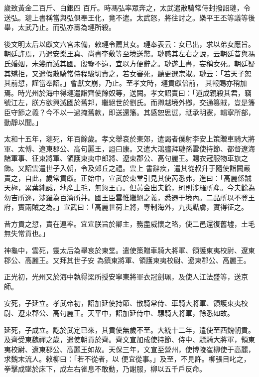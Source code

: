 \begin{pinyinscope}
 歲致黃金二百斤、白銀四
 百斤。時馮弘率眾奔之，太武遣散騎常侍封撥詔璉，令送弘。璉上書稱當與弘俱奉王化，竟不遣。太武怒，將往討之。樂平王丕等議等後舉，太武乃止。而弘亦壽為璉所殺。



 後文明太后以獻文六宮未備，敕璉令薦其女。璉奉表云：女已出，求以弟女應旨。朝廷許焉，乃遣安樂王真、尚書李敷等至境送幣。璉惑其左右之說，云朝廷昔與馮氏婚姻，未幾而滅其國。殷鑒不遠，宜以方便辭之。璉遂上書，妄稱女死。朝廷疑其矯拒，又遣假散騎常侍程駿切責之，若女審死，聽更選宗淑。璉云：「若天子恕其前愆，謹當奉詔。」會獻文崩，乃止。至孝文時，璉貢獻倍前，
 其報賜亦稍加焉。時光州於海中得璉遣詣齊使餘奴等，送闕。孝文詔責曰：「道成親殺其君，竊號江左，朕方欲興滅國於舊邦，繼絕世於劉氏。而卿越境外鄉，交通篡賊，豈是籓臣守節之義？今不以一過掩舊款，即送還籓。其感恕思愆，祗承明憲，輯寧所部，動靜以聞。」



 太和十五年，璉死，年百餘歲。孝文舉哀於東郊，遣謁者僕射李安上策贈車騎大將軍、太傅、遼東郡公、高句麗王，謚曰康。又遣大鴻臚拜璉孫雲使持節、都督遼海諸軍事、征東將軍、領護東夷中郎將、遼東郡公、高句麗王。賜衣冠服物車旗之飾。又詔雲遣世子入朝，令及郊丘之禮。雲上
 書辭疾，遣其從叔升于隨使詣闕嚴責之，自此，歲常貢獻。正始中，宣武於東堂引見其使芮悉弗，進曰：「高麗係誠天極，累葉純誠，地產土毛，無愆王貢。但黃金出夫餘，珂則涉羅所產。今夫餘為勿吉所逐，涉羅為百濟所并。國王臣雲惟繼絕之義，悉遷于境內。二品所以不登王府，實兩賊之為。」宣武曰：「高麗世荷上將，專制海外，九夷黠虜，實得征之。



 昔方貢之愆，責在連率。宜宣朕旨於卿主，務盡威懷之略，使二邑還復舊墟，土毛無失常貢也。」



 神龜中，雲死，靈太后為舉哀於東堂。遣使策贈車騎大將軍、領護東夷校尉、遼東郡公、高麗王。又拜其世子安
 為鎮東將軍、領護東夷校尉、遼東郡公、高麗王。



 正光初，光州又於海中執得梁所授安寧東將軍衣冠劍珮，及使人江法盛等，送京師。



 安死，子延立。孝武帝初，詔加延使持節、散騎常侍、車騎大將軍、領護東夷校尉、遼東郡公、高句麗王。天平中，詔加延侍中、驃騎大將軍，餘悉如故。



 延死，子成立。訖於武定已來，其貢使無歲不至。大統十二年，遣使至西魏朝貢。及齊受東魏禪之歲，遣使朝貢於齊。齊文宣加成使持節、侍中、驃騎大將軍，領東夷校尉、遼東郡公、高麗王如故。天保三年，文宣至營州，使博陵崔柳使于高麗，求魏末流人。敕柳曰：「若不從者，以
 便宜從事。」及至，不見許。柳張目叱之，拳擊成墜於床下，成左右雀息不敢動，乃謝服，柳以五千戶反命。




\end{pinyinscope}
